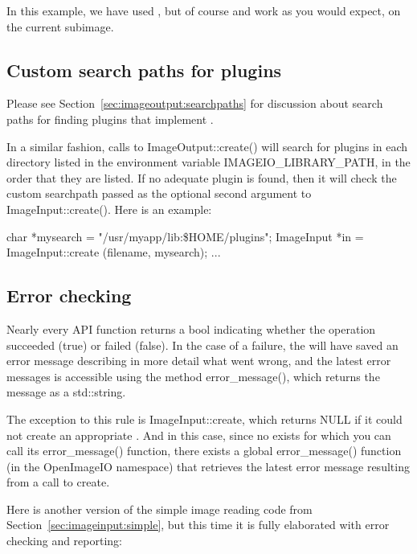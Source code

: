 In this example, we have used \readimage, but of course \readscanline
and \readtile work as you would expect, on the current subimage.


\subsection{Custom search paths for plugins}
\label{sec:imageinput:searchpaths}

Please see Section~\ref{sec:imageoutput:searchpaths} for discussion
about search paths for finding plugins that implement \ImageOutput.

In a similar fashion, calls to {\cf ImageOutput::create()}
will search for plugins in each directory listed in the environment
variable {\cf IMAGEIO_LIBRARY_PATH}, in the order that they are listed.
If no adequate plugin is found, then it will check the custom searchpath
passed as the optional second argument to {\cf ImageInput::create()}.
Here is an example:

\begin{code}
        char *mysearch = "/usr/myapp/lib:\${HOME}/plugins";
        ImageInput *in = ImageInput::create (filename, mysearch);
        ...
\end{code}


\subsection{Error checking}
\label{sec:imageinput:errors}

Nearly every \ImageInput API function returns a {\cf bool} indicating
whether the operation succeeded ({\cf true}) or failed ({\cf false}).
In the case of a failure, the \ImageInput will have saved an error
message describing in more detail what went wrong, and the latest
error messages is accessible using the \ImageInput method 
{\cf error_message()}, which returns the message as a {\cf std::string}.

The exception to this rule is {\cf ImageInput::create}, which returns
{\cf NULL} if it could not create an appropriate \ImageInput.  And in
this case, since no \ImageInput exists for which you can call its {\cf
  error_message()} function, there exists a global {\cf error_message()}
function (in the {\cf OpenImageIO} namespace) that retrieves the latest
error message resulting from a call to {\cf create}.

Here is another version of the simple image reading code from
Section~\ref{sec:imageinput:simple}, but this time it is fully
elaborated with error checking and reporting:

